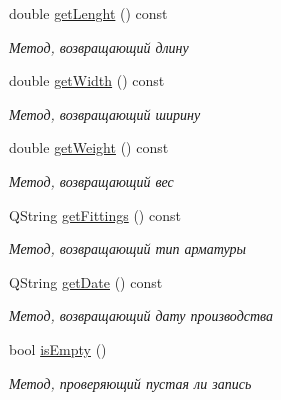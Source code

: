 \begin{DoxyCompactItemize}
double \mbox{\hyperlink{class_data_a2c645813f887202f6496656db444dfa8}{get\+Lenght}} () const
\begin{DoxyCompactList}\small\item\em Метод, возвращающий длину \end{DoxyCompactList}\item 
\mbox{\label{class_data_a86e46d8f7398ae1203dddc2af0ac23ce}} 
double \mbox{\hyperlink{class_data_a86e46d8f7398ae1203dddc2af0ac23ce}{get\+Width}} () const
\begin{DoxyCompactList}\small\item\em Метод, возвращающий ширину \end{DoxyCompactList}\item 
\mbox{\label{class_data_a6585737d5d0ae04908b0824eac0e1281}} 
double \mbox{\hyperlink{class_data_a6585737d5d0ae04908b0824eac0e1281}{get\+Weight}} () const
\begin{DoxyCompactList}\small\item\em Метод, возвращающий вес \end{DoxyCompactList}\item 
\mbox{\label{class_data_a790e2bf1b38403692f1ddcd75036ceea}} 
Q\+String \mbox{\hyperlink{class_data_a790e2bf1b38403692f1ddcd75036ceea}{get\+Fittings}} () const
\begin{DoxyCompactList}\small\item\em Метод, возвращающий тип арматуры \end{DoxyCompactList}\item 
\mbox{\label{class_data_a7019fc482506793c385f31ccd8edc7d4}} 
Q\+String \mbox{\hyperlink{class_data_a7019fc482506793c385f31ccd8edc7d4}{get\+Date}} () const
\begin{DoxyCompactList}\small\item\em Метод, возвращающий дату производства \end{DoxyCompactList}\item 
\mbox{\label{class_data_a93468d3b8b2ce0f73e369e5de160534e}} 
bool \mbox{\hyperlink{class_data_a93468d3b8b2ce0f73e369e5de160534e}{is\+Empty}} ()
\begin{DoxyCompactList}\small\item\em Метод, проверяющий пустая ли запись \end{DoxyCompactList}\end{DoxyCompactItemize}
